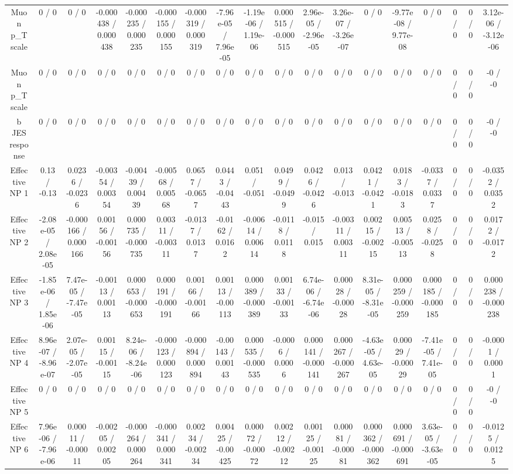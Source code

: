 \documentclass[10pt]{article}
\begin{document}
\begin{table}[htbp]
\begin{center}
\begin{tabular}{|c|c|c|c|c|c|c|c|c|c|c|c|c|c|c|c|c|c|}
  Muon p_{T} scale & 0 / 0 & 0 / 0 & -0.000438 / 0.000438 & -0.000235 / 0.000235 & -0.000155 / 0.000155 & -0.000319 / 0.000319 & -7.96e-05 / 7.96e-05 & -1.19e-06 / 1.19e-06 & 0.000515 / -0.000515 & 2.96e-05 / -2.96e-05 & 3.26e-07 / -3.26e-07 & 0 / 0 & -9.77e-08 / 9.77e-08 & 0 / 0 & 0 / 0 & 0 / 0 & 3.12e-06 / -3.12e-06 \\ 
  Muon p_{T} scale & 0 / 0 & 0 / 0 & 0 / 0 & 0 / 0 & 0 / 0 & 0 / 0 & 0 / 0 & 0 / 0 & 0 / 0 & 0 / 0 & 0 / 0 & 0 / 0 & 0 / 0 & 0 / 0 & 0 / 0 & 0 / 0 & -0 / -0 \\ 
  b JES response & 0 / 0 & 0 / 0 & 0 / 0 & 0 / 0 & 0 / 0 & 0 / 0 & 0 / 0 & 0 / 0 & 0 / 0 & 0 / 0 & 0 / 0 & 0 / 0 & 0 / 0 & 0 / 0 & 0 / 0 & 0 / 0 & -0 / -0 \\ 
  Effective NP 1 & 0.13 / -0.13 & 0.0236 / -0.0236 & -0.00354 / 0.00354 & -0.00439 / 0.00439 & -0.00568 / 0.00568 & 0.0657 / -0.0657 & 0.0443 / -0.0443 & 0.051 / -0.051 & 0.0499 / -0.0499 & 0.0426 / -0.0426 & 0.013 / -0.013 & 0.0421 / -0.0421 & 0.0183 / -0.0183 & -0.0337 / 0.0337 & 0 / 0 & 0 / 0 & -0.0352 / 0.0352 \\ 
  Effective NP 2 & -2.08e-05 / 2.08e-05 & -0.000166 / 0.000166 & 0.00156 / -0.00156 & 0.000735 / -0.000735 & 0.00311 / -0.00311 & -0.0137 / 0.0137 & -0.0162 / 0.0162 & -0.00614 / 0.00614 & -0.0118 / 0.0118 & -0.015 / 0.015 & -0.00311 / 0.00311 & 0.00215 / -0.00215 & 0.00513 / -0.00513 & 0.0258 / -0.0258 & 0 / 0 & 0 / 0 & 0.0172 / -0.0172 \\ 
  Effective NP 3 & -1.85e-06 / 1.85e-06 & 7.47e-05 / -7.47e-05 & -0.00113 / 0.00113 & 0.000653 / -0.000653 & 0.000191 / -0.000191 & 0.00166 / -0.00166 & 0.00113 / -0.00113 & 0.000389 / -0.000389 & 0.00133 / -0.00133 & 6.74e-06 / -6.74e-06 & 0.00028 / -0.00028 & 8.31e-05 / -8.31e-05 & 0.000259 / -0.000259 & 0.000185 / -0.000185 & 0 / 0 & 0 / 0 & 0.000238 / -0.000238 \\ 
  Effective NP 4 & 8.96e-07 / -8.96e-07 & 2.07e-05 / -2.07e-05 & 0.00115 / -0.00115 & 8.24e-06 / -8.24e-06 & -0.000123 / 0.000123 & -0.000894 / 0.000894 & -0.00143 / 0.00143 & 0.000535 / -0.000535 & -0.0006 / 0.0006 & 0.000141 / -0.000141 & 0.000267 / -0.000267 & -4.63e-05 / 4.63e-05 & 0.00029 / -0.00029 & -7.41e-05 / 7.41e-05 & 0 / 0 & 0 / 0 & -0.0001 / 0.0001 \\ 
  Effective NP 5 & 0 / 0 & 0 / 0 & 0 / 0 & 0 / 0 & 0 / 0 & 0 / 0 & 0 / 0 & 0 / 0 & 0 / 0 & 0 / 0 & 0 / 0 & 0 / 0 & 0 / 0 & 0 / 0 & 0 / 0 & 0 / 0 & -0 / -0 \\ 
  Effective NP 6 & 7.96e-06 / -7.96e-06 & 0.00011 / -0.00011 & -0.00205 / 0.00205 & -0.000264 / 0.000264 & -0.000341 / 0.000341 & 0.00234 / -0.00234 & 0.00425 / -0.00425 & 0.00072 / -0.00072 & 0.00212 / -0.00212 & 0.00125 / -0.00125 & 0.00081 / -0.00081 & 0.000362 / -0.000362 & 0.000691 / -0.000691 & 3.63e-05 / -3.63e-05 & 0 / 0 & 0 / 0 & -0.0125 / 0.0125 \\ 

\end{tabular}
\end{center}
\end{table}
\end{document}
